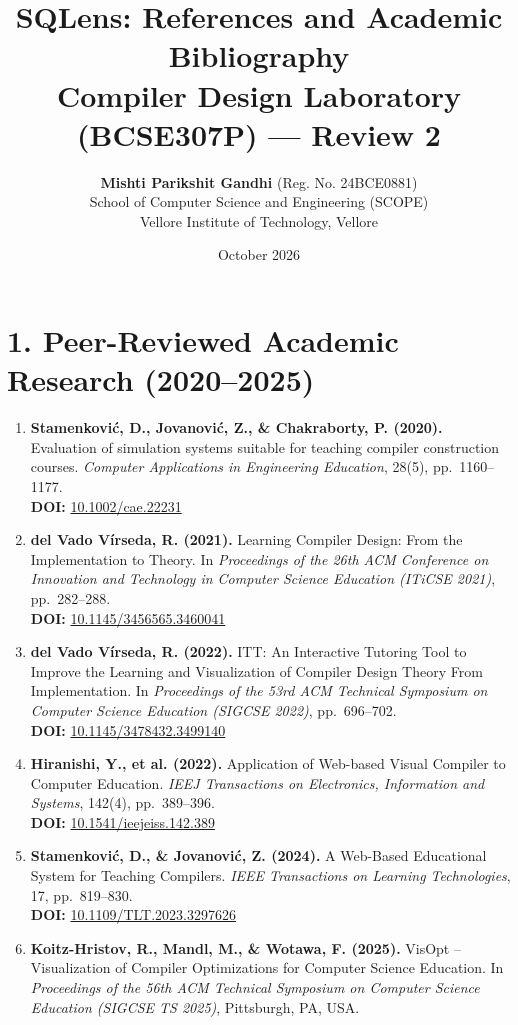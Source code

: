 \documentclass[11pt,a4paper]{article}
\title{\textbf{SQLens: References and Academic Bibliography}\\[0.5ex]\large Compiler Design Laboratory (BCSE307P) --- Review 2}
\author{\textbf{Mishti Parikshit Gandhi} (Reg. No. 24BCE0881)\\School of Computer Science and Engineering (SCOPE)\\Vellore Institute of Technology, Vellore}
\date{October 2026}
\begin{document}
\maketitle

\section*{1. Peer-Reviewed Academic Research (2020--2025)}

\begin{enumerate}
    \item \textbf{Stamenkovi\'c, D., Jovanovi\'c, Z., \& Chakraborty, P. (2020).} 
    Evaluation of simulation systems suitable for teaching compiler construction courses. 
    \textit{Computer Applications in Engineering Education}, 28(5), pp.~1160--1177. \\
    \textbf{DOI:} \href{https://doi.org/10.1002/cae.22231}{10.1002/cae.22231}
    
    \item \textbf{del Vado V\'irseda, R. (2021).} 
    Learning Compiler Design: From the Implementation to Theory. 
    In \textit{Proceedings of the 26th ACM Conference on Innovation and Technology in Computer Science Education (ITiCSE 2021)}, pp.~282--288. \\
    \textbf{DOI:} \href{https://doi.org/10.1145/3456565.3460041}{10.1145/3456565.3460041}
    
    \item \textbf{del Vado V\'irseda, R. (2022).} 
    ITT: An Interactive Tutoring Tool to Improve the Learning and Visualization of Compiler Design Theory From Implementation. 
    In \textit{Proceedings of the 53rd ACM Technical Symposium on Computer Science Education (SIGCSE 2022)}, pp.~696--702. \\
    \textbf{DOI:} \href{https://doi.org/10.1145/3478432.3499140}{10.1145/3478432.3499140}
    
    \item \textbf{Hiranishi, Y., et al. (2022).} 
    Application of Web-based Visual Compiler to Computer Education. 
    \textit{IEEJ Transactions on Electronics, Information and Systems}, 142(4), pp.~389--396. \\
    \textbf{DOI:} \href{https://doi.org/10.1541/ieejeiss.142.389}{10.1541/ieejeiss.142.389}
    
    \item \textbf{Stamenkovi\'c, D., \& Jovanovi\'c, Z. (2024).} 
    A Web-Based Educational System for Teaching Compilers. 
    \textit{IEEE Transactions on Learning Technologies}, 17, pp.~819--830. \\
    \textbf{DOI:} \href{https://doi.org/10.1109/TLT.2023.3297626}{10.1109/TLT.2023.3297626}
    
    \item \textbf{Koitz-Hristov, R., Mandl, M., \& Wotawa, F. (2025).} 
    VisOpt -- Visualization of Compiler Optimizations for Computer Science Education. 
    In \textit{Proceedings of the 56th ACM Technical Symposium on Computer Science Education (SIGCSE TS 2025)}, Pittsburgh, PA, USA.
\end{enumerate}
\end{document}
